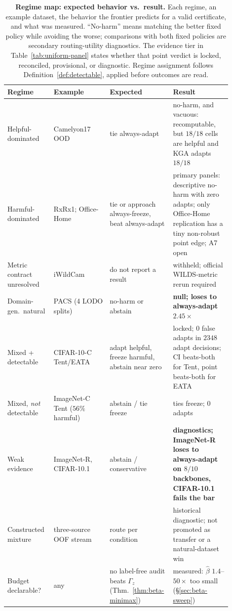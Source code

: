 \begin{table}[t]\centering\footnotesize
\caption{\textbf{Regime map: expected behavior vs.\ result.} Each regime, an example dataset, the
behavior the frontier predicts for a valid certificate, and what was measured. ``No-harm'' means
matching the better fixed policy while avoiding the worse; comparisons with both fixed policies are
secondary routing-utility diagnostics. The evidence tier in Table~\ref{tab:uniform-panel}
states whether that point verdict is locked, reconciled, provisional, or diagnostic. Regime
assignment follows Definition~\ref{def:detectable}, applied before outcomes are read.}
\label{tab:regime-summary}
\begin{tabular}{@{}p{0.19\linewidth}p{0.24\linewidth}p{0.22\linewidth}p{0.25\linewidth}@{}}
\toprule
Regime & Example & Expected & Result \\
\midrule
Helpful-dominated & Camelyon17 OOD & tie always-adapt & no-harm, and vacuous: recomputable, but $18/18$ cells are helpful and KGA adapts $18/18$ \\
Harmful-dominated & RxRx1; Office-Home & tie or approach always-freeze, beat always-adapt & primary panels: descriptive no-harm with zero adapts; only Office-Home replication has a tiny non-robust point edge; A7 open \\
Metric contract unresolved & iWildCam & do not report a result & withheld; official WILDS-metric rerun required \\
Domain-gen.\ natural & PACS (4 LODO splits) & no-harm or abstain & \textbf{null; loses to always-adapt} $2.45\times$ \\
Mixed + detectable & CIFAR-10-C Tent/EATA & adapt helpful, freeze harmful, abstain near zero & locked; $0$ false adapts in $2348$ adapt decisions; CI beats-both for Tent, point beats-both for EATA \\
Mixed, \emph{not} detectable & ImageNet-C Tent ($56\%$ harmful) & abstain / tie freeze & ties freeze; $0$ adapts \\
Weak evidence & ImageNet-R, CIFAR-10.1 & abstain / conservative & \textbf{diagnostics; ImageNet-R loses to always-adapt on $8/10$ backbones, CIFAR-10.1 fails the bar} \\
Constructed mixture & three-source OOF stream & route per condition & historical diagnostic; not promoted as transfer or a natural-dataset win \\
\midrule
Budget declarable? & any & no label-free audit beats $\Gamma_z$ (Thm.~\ref{thm:beta-minimax}) & measured: $\widehat\beta$ $1.4$--$50\times$ too small (\S\ref{sec:beta-sweep}) \\
\bottomrule
\end{tabular}
\end{table}

